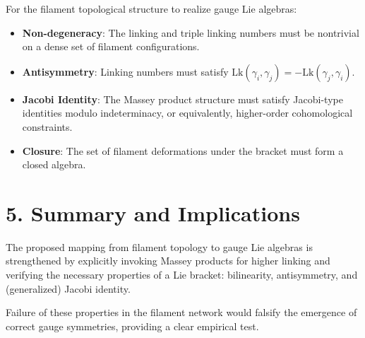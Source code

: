 \documentclass{article}
\begin{document}
For the filament topological structure to realize gauge Lie algebras:
\begin{itemize}
    \item \textbf{Non-degeneracy}: The linking and triple linking numbers must be nontrivial on a dense set of filament configurations.
    \item \textbf{Antisymmetry}: Linking numbers must satisfy $\text{Lk}(\gamma_i, \gamma_j) = -\text{Lk}(\gamma_j, \gamma_i)$.
    \item \textbf{Jacobi Identity}: The Massey product structure must satisfy Jacobi-type identities modulo indeterminacy, or equivalently, higher-order cohomological constraints.
    \item \textbf{Closure}: The set of filament deformations under the bracket must form a closed algebra.
\end{itemize}

\section*{5. Summary and Implications}

The proposed mapping from filament topology to gauge Lie algebras is strengthened by explicitly invoking Massey products for higher linking and verifying the necessary properties of a Lie bracket: bilinearity, antisymmetry, and (generalized) Jacobi identity.

Failure of these properties in the filament network would falsify the emergence of correct gauge symmetries, providing a clear empirical test.
\end{document}
